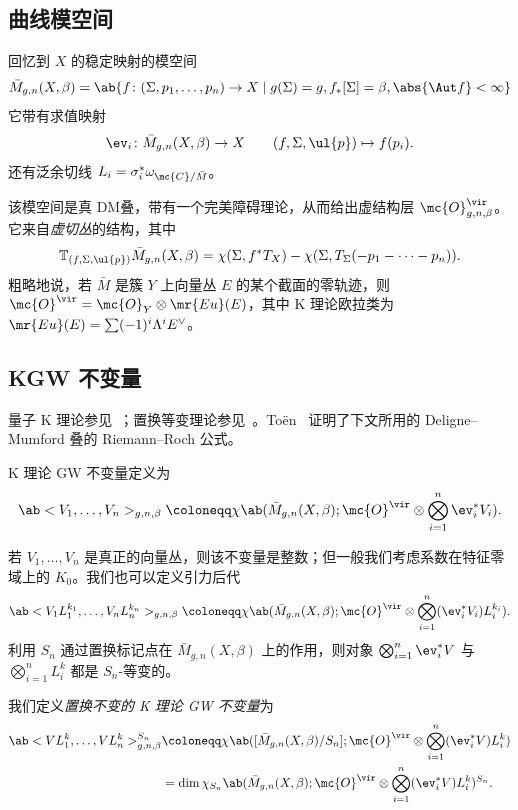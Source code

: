 \subsection{曲线模空间}%
\label{sub:Moduli of curves}

回忆到 \(X\) 的稳定映射的模空间
\[ \bar{M}_{g,n}(X, \beta) = \ab\{ f \colon (\Sigma, p_1, \ldots, p_n) \to X \mid g(\Sigma) = g, f_*[\Sigma] = \beta, \abs{\Aut f} < \infty \} \]
它带有求值映射
\[ \ev_i \colon \bar{M}_{g,n}(X, \beta) \to X \qquad (f, \Sigma, \ul{p}) \mapsto f(p_i). \]
还有泛余切线 \(L_i = \sigma_i^* \omega_{ \mc{C}/\bar{M} }\)。

该模空间是真 DM叠，带有一个完美障碍理论，从而给出虚结构层 \(\mc{O}^{\vir}_{g,n,\beta}\)。它来自\textit{虚切丛}的结构，其中
\[ \mathbb{T}_{(f, \Sigma, \ul{p})} \bar{M}_{g,n}(X, \beta) = \chi(\Sigma, f^* T_X) - \chi(\Sigma, T_{\Sigma}(-p_1 - \cdots - p_n)). \]
粗略地说，若 \(\bar{M}\) 是簇 \(Y\) 上向量丛 \(E\) 的某个截面的零轨迹，则 \(\mc{O}^{\vir} = \mc{O}_Y \otimes \mr{Eu}(E)\)，其中 K 理论欧拉类为 \(\mr{Eu}(E) = \sum (-1)^i \Lambda^i E^{\vee}\)。

\subsection{KGW 不变量}%
\label{sub:KGW invariants}

量子 K 理论参见~\cite{Lee2004}；置换等变理论参见~\cite{Givental2017K1,GiventalK7}。To\"en~\cite{Toen1999} 证明了下文所用的 Deligne--Mumford 叠的 Riemann--Roch 公式。

\begin{defn}
    K 理论 GW 不变量定义为
    \[ \ab<V_1, \ldots, V_n>_{g,n,\beta} \coloneqq \chi\ab(\bar{M}_{g,n}(X, \beta); \mc{O}^{\vir} \otimes \bigotimes_{i=1}^n \ev_i^* V_i). \]
\end{defn}

若 \(V_1, \ldots, V_n\) 是真正的向量丛，则该不变量是整数；但一般我们考虑系数在特征零域上的 \(K_0\)。我们也可以定义引力后代
\[ \ab<V_1 L_1^{k_1}, \ldots, V_n L_n^{k_n}>_{g,n,\beta} \coloneqq \chi\ab(\bar{M}_{g,n}(X, \beta); \mc{O}^{\vir} \otimes \bigotimes_{i=1}^n ( \ev_i^* V_i )L_i^{k_i} ). \]
利用 \(S_n\) 通过置换标记点在 \(\bar{M}_{g,n}(X, \beta)\) 上的作用，则对象 \(\bigotimes_{i=1}^n \ev_i^* V\) 与 \(\bigotimes_{i=1}^n L_i^k\) 都是 \(S_n\)-等变的。

\begin{defn}
    我们定义\textit{置换不变的 K 理论 GW 不变量}为
    \begin{align*}
        \ab<V L_1^k, \ldots, V L_n^k>_{g,n,\beta}^{S_n} &\coloneqq \chi\ab([ \bar{M}_{g,n}(X, \beta)/S_n ]; \mc{O}^{\vir} \otimes \bigotimes_{i=1}^n ( \ev_i^* V ) L_i^k) \\
        &= \dim \chi_{S_n} \ab(\bar{M}_{g,n}(X, \beta); \mc{O}^{\vir} \otimes \bigotimes_{i=1}^n ( \ev_i^* V ) L_i^k )^{S_n}.
    \end{align*}
\end{defn}

